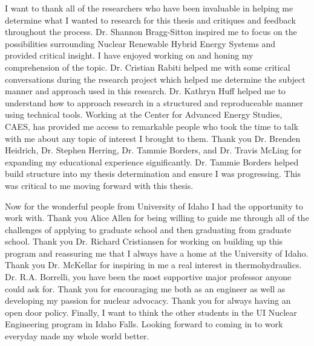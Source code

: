\documentclass[12pt]{UIdahoMastersThesis}
\begin{document}
I want to thank all of the researchers who have been invaluable in helping me determine what I wanted to research for this thesis and critiques and feedback throughout the process. Dr. Shannon Bragg-Sitton inspired me to focus on the possibilities surrounding Nuclear Renewable Hybrid Energy Systems and provided critical insight. I have enjoyed working on and honing my comprehension of the topic. Dr. Cristian Rabiti helped me with some critical conversations during the research project which helped me determine the subject manner and approach used in this research. Dr. Kathryn Huff helped me to understand how to approach research in a structured and reproduceable manner using technical tools. Working at the Center for Advanced Energy Studies, CAES, has provided me access to remarkable people who took the time to talk with me about any topic of interest I brought to them. Thank you Dr. Brenden Heidrich, Dr. Stephen Herring, Dr. Tammie Borders, and Dr. Travis McLing for expanding my educational experience significantly. Dr. Tammie Borders helped build structure into my thesis determination and ensure I was  progressing.  This was critical to me moving forward with this thesis. 
    

Now for the wonderful people from University of Idaho I had the opportunity to work with.  Thank you Alice Allen for being willing to guide me through all of the challenges of applying to graduate school and then graduating from graduate school. Thank you Dr. Richard Cristiansen for working on building up this program and reassuring me that I always have a home at the University of Idaho. Thank you Dr. McKellar for inspiring in me a real interest in thermohydraulics.  Dr. R.A. Borrelli, you have been the most supportive major professor anyone could ask for. Thank you for encouraging me both as an engineer as well as developing my passion for nuclear advocacy.  Thank you for always having an open door policy. Finally, I want to think the other students in the UI Nuclear Engineering program in Idaho Falls. Looking forward to coming in to work everyday made my whole world better. 
% 
% 

 
\end{document}
